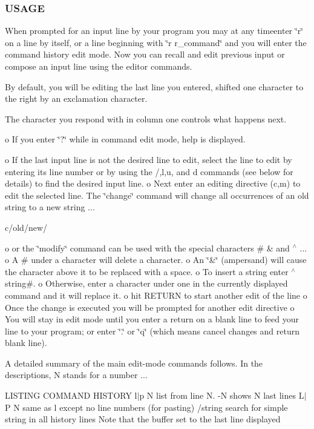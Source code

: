 \subsubsection*{U\+S\+A\+GE}

When prompted for an input line by your program you may at any timeenter \char`\"{}r\char`\"{} on a line by itself, or a line beginning with \char`\"{}r
    r\+\_\+command\char`\"{} and you will enter the command history edit mode. Now you can recall and edit previous input or compose an input line using the editor commands.

By default, you will be editing the last line you entered, shifted one character to the right by an exclamation character.

The character you respond with in column one controls what happens next.

o If you enter \char`\"{}?\char`\"{} while in command edit mode, help is displayed.

o If the last input line is not the desired line to edit, select the line to edit by entering it\textquotesingle{}s line number or by using the /,l,u, and d commands (see below for details) to find the desired input line. o Next enter an editing directive (c,m) to edit the selected line. The \char`\"{}change\char`\"{} command will change all occurrences of an old string to a new string ...

c/old/new/

o or the \char`\"{}modify\char`\"{} command can be used with the special characters \# \& and $^\wedge$ ... o A \# under a character will delete a character. o An \char`\"{}\&\char`\"{} (ampersand) will cause the character above it to be replaced with a space. o To insert a string enter $^\wedge$string\#. o Otherwise, enter a character under one in the currently displayed command and it will replace it. o hit R\+E\+T\+U\+RN to start another edit of the line o Once the change is executed you will be prompted for another edit directive o You will stay in edit mode until you enter a return on a blank line to feed your line to your program; or enter \char`\"{}.\char`\"{} or \char`\"{}q\char`\"{} (which means cancel changes and return blank line).

A detailed summary of the main edit-\/mode commands follows. In the descriptions, N stands for a number ...

L\+I\+S\+T\+I\+NG C\+O\+M\+M\+A\+ND H\+I\+S\+T\+O\+RY l$\vert$p N list from line N. -\/N shows N last lines L$\vert$P N same as \textquotesingle{}l\textquotesingle{} except no line numbers (for pasting) /string search for simple string in all history lines Note that the buffer set to the last line displayed

